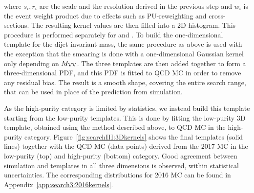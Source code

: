 where $s_{i}, r_{i}$ are the scale and the resolution derived in the previous step and $w_i$ is the event weight product due to effects such as PU-reweighting and cross-sections. The resulting kernel values are then filled into a 2D histogram. This procedure is performed separately for \MJO and \MJT. To build the one-dimensional template for the dijet invariant mass, the same procedure as above is used with the exception that the smearing is done with a one-dimensional Gaussian kernel only depending on $M_{\rm VV}$. The three templates are then added together to form a three-dimensional PDF, and this PDF is fitted to QCD MC in order to remove any residual bias. The result is a smooth shape, covering the entire search range, that can be used in place of the prediction from simulation.\par
As the high-purity category is limited by statistics, we instead build this template starting from the low-purity templates. This is done by fitting the low-purity 3D template, obtained using the method described above, to QCD MC in the high-purity category. Figure~\ref{fig:searchIII:3Dkernels} shows the final templates (solid lines) together with the QCD MC (data points) derived from the 2017 MC in the low-purity (top) and high-purity (bottom) category. Good agreement between simulation and templates in all three dimensions is observed, within statistical uncertainties. The corresponding distributions for 2016 MC can be found in Appendix~\ref{app:search3:2016kernels}.\par
